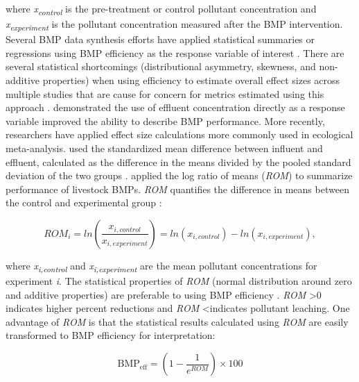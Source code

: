 \documentclass[utf8]{FrontiersinHarvard}
\begin{document}
where \emph{x\textsubscript{control}} is the pre-treatment or control pollutant concentration and \emph{x\textsubscript{experiment}} is the pollutant concentration measured after the BMP intervention.
Several BMP data synthesis efforts have applied statistical summaries or regressions using BMP efficiency as the response variable of interest \citep{agouridisLivestockGrazingManagement2005, claryBMPPerformanceAnalysis2011, kochNitrogenRemovalStormwater2014, krogerReviewBestManagement2012, liuReviewEffectivenessBest2017, simpsonDevelopingBestManagement2009}.
There are several statistical shortcomings (distributional asymmetry, skewness, and non-additive properties) when using efficiency to estimate overall effect sizes across multiple studies that are cause for concern for metrics estimated using this approach \citep{nuzzoPercentDifferencesAnother2018, coleStatisticsNotesWhat2017}.
\citet{barrettPerformanceComparisonStructural2005} demonstrated the use of effluent concentration directly as a response variable improved the ability to describe BMP performance.
More recently, researchers have applied effect size calculations more commonly used in ecological meta-analysis.
\citet{horvathEffectsRegionalClimate2023} used the standardized mean difference between influent and effluent, calculated as the difference in the means divided by the pooled standard deviation of the two groups \citep{hedgesStatisticalMethodsMetaanalysis1985}.
\citet{grudzinskiDoesRiparianFencing2020} applied the log ratio of means (\emph{ROM}) to summarize performance of livestock BMPs.
\emph{ROM} quantifies the difference in means between the control and experimental group \citep{hedgesMetaanalysisResponseRatios1999}:

\[
ROM_i = ln\left(\frac{x_{i,control}}{x_{i,experiment}}\right) = ln(x_{i, control})-ln(x_{i, experiment}),
\]

where \emph{x\textsubscript{i,control}} and \emph{x\textsubscript{i,experiment}} are the mean pollutant concentrations for experiment \emph{i}.
The statistical properties of \emph{ROM} (normal distribution around zero and additive properties) are preferable to using BMP efficiency \citep{osenbergEffectSizeEcological1997, hedgesMetaanalysisResponseRatios1999}.
\emph{ROM} \textgreater 0 indicates higher percent reductions and \emph{ROM} \textless indicates pollutant leaching.
One advantage of \emph{ROM} is that the statistical results calculated using \emph{ROM} are easily transformed to BMP efficiency for interpretation:

\[
\text{BMP}_{\text{eff}} = \left( 1 - \frac{1}{e^{ROM}}\right) \times 100
\]
\end{document}
